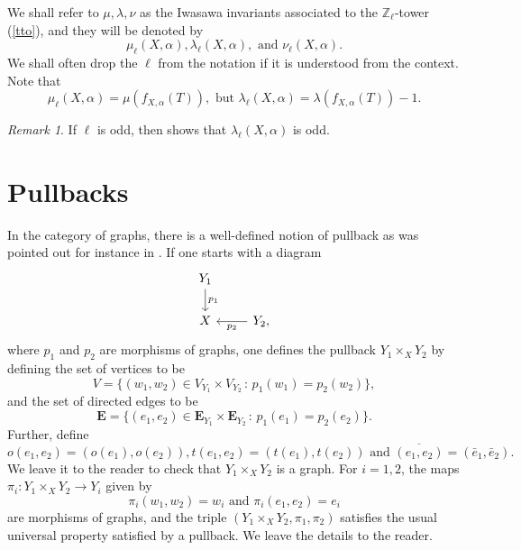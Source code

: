 \documentclass[11pt]{amsart}
\numberwithin{equation}{section}
\theoremstyle{remark}
\newtheorem{remark}[theorem]{Remark}
\begin{document}
We shall refer to $\mu,\lambda,\nu$ as the Iwasawa invariants associated to the $\mathbb{Z}_{\ell}$-tower (\ref{tto}), and they will be denoted by
$$\mu_{\ell}(X,\alpha),\lambda_{\ell}(X,\alpha), \text{ and } \nu_{\ell}(X,\alpha). $$
We shall often drop the $\ell$ from the notation if it is understood from the context.  Note that
$$\mu_{\ell}(X,\alpha) = \mu(f_{X,\alpha}(T)), \text{ but } \lambda_{\ell}(X,\alpha) = \lambda(f_{X,\alpha}(T)) - 1.$$
\begin{remark}
If $\ell$ is odd, then \cite[Theorem 2.14]{DLRV} shows that $\lambda_{\ell}(X,\alpha)$ is odd.
\end{remark}

\section{Pullbacks} \label{pullb}
In the category of graphs, there is a well-defined notion of pullback as was pointed out for instance in \cite{Stallings:1983}.  If one starts with a diagram
\begin{equation*}
\begin{tikzcd}
Y_{1} \arrow["p_{1}",d] & \\
X & \arrow["p_{2}",l] Y_{2},
\end{tikzcd}
\end{equation*}
where $p_{1}$ and $p_{2}$ are morphisms of graphs, one defines the pullback $Y_{1} \times_{X}Y_{2}$ by defining the set of vertices to be
$$V = \{(w_{1},w_{2}) \in V_{Y_{1}}\times V_{Y_{2}} \, : \, p_{1}(w_{1}) = p_{2}(w_{2}) \}, $$
and the set of directed edges to be
$$\mathbf{E} = \{(e_{1},e_{2}) \in \mathbf{E}_{Y_{1}}\times\mathbf{E}_{Y_{2}} \, : \, p_{1}(e_{1}) = p_{2}(e_{2}) \}. $$
Further, define
$$o(e_{1},e_{2}) = (o(e_{1}),o(e_{2})), t(e_{1},e_{2}) = (t(e_{1}),t(e_{2})) \text{ and } \overline{(e_{1},e_{2})} = (\bar{e}_{1},\bar{e}_{2}). $$
We leave it to the reader to check that $Y_{1}\times_{X}Y_{2}$ is a graph.  For $i=1,2$, the maps $\pi_{i}:Y_{1}\times_{X}Y_{2} \rightarrow Y_{i}$ given by 
$$\pi_{i}(w_{1},w_{2}) = w_{i} \text{ and } \pi_{i}(e_{1},e_{2}) = e_{i} $$
are morphisms of graphs, and the triple $(Y_{1}\times_{X}Y_{2},\pi_{1},\pi_{2})$ satisfies the usual universal property satisfied by a pullback.  We leave the details to the reader.
\end{document}
